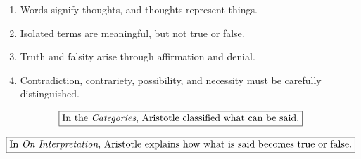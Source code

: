 \documentclass[12pt]{article}
\begin{document}
\begin{enumerate}[itemsep=0.5em]
    \item Words signify thoughts, and thoughts represent things.
    \item Isolated terms are meaningful, but not true or false.
    \item Truth and falsity arise through affirmation and denial.
    \item Contradiction, contrariety, possibility, and necessity must be
    carefully distinguished.
\end{enumerate}

\[
\boxed{
\text{In the \textit{Categories}, Aristotle classified what can be said.}
}
\]

\[
\boxed{
\text{In \textit{On Interpretation}, Aristotle explains how what is said becomes true or false.}
}
\]
\end{document}
